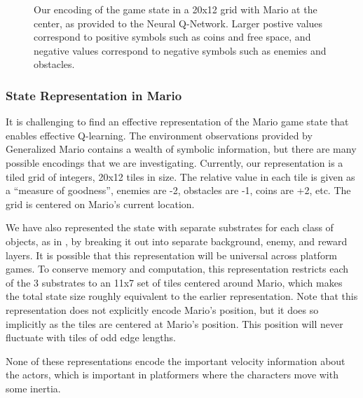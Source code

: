 \documentclass{article}
\begin{document}
\begin{figure}
\begin{center}
\caption{Our encoding of the game state in a 20x12 grid with Mario at the center, as provided to the Neural Q-Network. Larger postive values correspond to positive symbols such as coins and free space, and negative values correspond to negative symbols such as enemies and obstacles.}
\end{center}
\end{figure}

\subsubsection{State Representation in Mario}
It is challenging to find an effective representation of the Mario game state that enables effective Q-learning. The environment observations provided by Generalized Mario contains a wealth of symbolic information, but there are many possible encodings that we are investigating. Currently, our representation is a tiled grid of integers, 20x12 tiles in size. The relative value in each tile is given as a ``measure of goodness'', enemies are -2, obstacles are -1, coins are +2, etc. The grid is centered on Mario's current location. 

We have also represented the state with separate substrates for each class of objects, as in \cite{Hauskneck13}, by breaking it out into separate background, enemy, and reward layers. It is possible that this representation will be universal across platform games. To conserve memory and computation, this representation restricts each of the 3 substrates to an 11x7 set of tiles centered around Mario, which makes the total state size roughly equivalent to the earlier representation. Note that this representation does not explicitly encode Mario's position, but it does so implicitly as the tiles are centered at Mario's position. This position will never fluctuate with tiles of odd edge lengths.

None of these representations encode the important velocity information about the actors, which is important in platformers where the characters move with some inertia.
\end{document}
